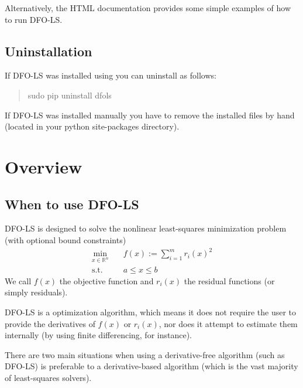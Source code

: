 \documentclass[letterpaper,10pt,english]{sphinxmanual}
\begin{document}
Alternatively, the HTML documentation provides some simple examples of how to run DFO-LS.


\section{Uninstallation}
\label{\detokenize{install:uninstallation}}
If DFO-LS was installed using  you can uninstall as follows:
\begin{quote}

\begin{sphinxVerbatim}[commandchars=\\\{\}]
\PYGZdl{} \PYG{o}{[}sudo\PYG{o}{]} pip uninstall dfols
\end{sphinxVerbatim}
\end{quote}

If DFO-LS was installed manually you have to remove the installed files by hand (located in your python site-packages directory).


\chapter{Overview}
\label{\detokenize{info:overview}}\label{\detokenize{info::doc}}

\section{When to use DFO-LS}
\label{\detokenize{info:when-to-use-dfo-ls}}
DFO-LS is designed to solve the nonlinear least-squares minimization problem (with optional bound constraints)
\begin{equation*}
\begin{split}\min_{x\in\mathbb{R}^n}  &\quad  f(x) := \sum_{i=1}^{m}r_{i}(x)^2 \\
\text{s.t.} &\quad  a \leq x \leq b\end{split}
\end{equation*}
We call \(f(x)\) the objective function and \(r_i(x)\) the residual functions (or simply residuals).

DFO-LS is a  optimization algorithm, which means it does not require the user to provide the derivatives of \(f(x)\) or \(r_i(x)\), nor does it attempt to estimate them internally (by using finite differencing, for instance).

There are two main situations when using a derivative-free algorithm (such as DFO-LS) is preferable to a derivative-based algorithm (which is the vast majority of least-squares solvers).
\end{document}
